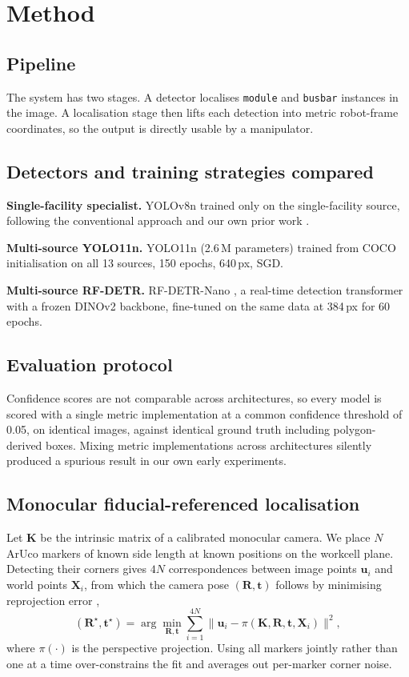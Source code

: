 \documentclass[conference]{IEEEtran}
\begin{document}
\section{Method}

\subsection{Pipeline}
The system has two stages. A detector localises \texttt{module} and \texttt{busbar}
instances in the image. A localisation stage then lifts each detection into metric
robot-frame coordinates, so the output is directly usable by a manipulator.

\subsection{Detectors and training strategies compared}
\textbf{Single-facility specialist.} YOLOv8n trained only on the single-facility
source, following the conventional approach and our own prior work
\cite{katiyar2026mvml}.

\textbf{Multi-source YOLO11n.} YOLO11n (2.6\,M parameters) \cite{yolo11} trained from
COCO initialisation on all 13 sources, 150 epochs, 640\,px, SGD.

\textbf{Multi-source RF-DETR.} RF-DETR-Nano \cite{rfdetr}, a real-time detection
transformer with a frozen DINOv2 \cite{dinov2} backbone, fine-tuned on the same data
at 384\,px for 60 epochs.

\subsection{Evaluation protocol}
Confidence scores are not comparable across architectures, so every model is scored
with a single metric implementation at a common confidence threshold of 0.05, on
identical images, against identical ground truth including polygon-derived boxes.
Mixing metric implementations across architectures silently produced a spurious result
in our own early experiments.

\subsection{Monocular fiducial-referenced localisation}
\label{sec:method-loc}
Let $\mathbf{K}$ be the intrinsic matrix of a calibrated monocular camera. We place
$N$ ArUco markers \cite{aruco2014} of known side length at known positions on the
workcell plane. Detecting their corners gives $4N$ correspondences between image
points $\mathbf{u}_i$ and world points $\mathbf{X}_i$, from which the camera pose
$(\mathbf{R},\mathbf{t})$ follows by minimising reprojection error
\cite{lepetit2009epnp},
\begin{equation}
(\mathbf{R}^\star,\mathbf{t}^\star)=\arg\min_{\mathbf{R},\mathbf{t}}
\sum_{i=1}^{4N}\bigl\lVert \mathbf{u}_i - \pi(\mathbf{K},\mathbf{R},\mathbf{t},\mathbf{X}_i)\bigr\rVert^2 ,
\end{equation}
where $\pi(\cdot)$ is the perspective projection. Using all markers jointly rather
than one at a time over-constrains the fit and averages out per-marker corner noise.
\end{document}
